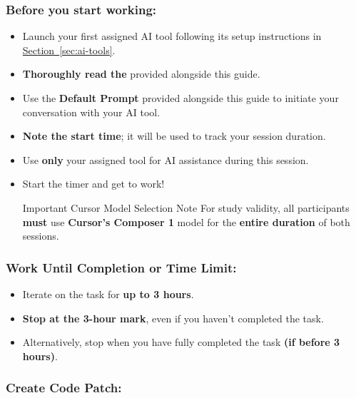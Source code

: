 \documentclass[11pt, a4paper]{article}
\newcommand{\inlinecode}[1]{%
    \raisebox{-0.2ex}{%
    \tcbox[
        enhanced,
        nobeforeafter,
        colback=codebackground,
        colframe=codebordercolor,
        coltext=codetextcolor,
        boxrule=0.5pt,
        arc=2pt,
        boxsep=0pt,
        left=0.8mm,
        right=0.8mm,
        top=0.3mm,
        bottom=0.3mm,
        fontupper=\ttfamily\small\color{codetextcolor}
    ]{#1}%
    }%
}
\begin{document}
\subsubsection*{Before you start working:}
    
    \begin{itemize}
        \item Launch your first assigned AI tool following its setup instructions in \hyperref[sec:ai-tools]{Section~\ref*{sec:ai-tools}}.
        \item \textbf{Thoroughly read the} \inlinecode{PRD.md} provided alongside this guide.
        \item Use the \textbf{Default Prompt} provided alongside this guide to initiate your conversation with your AI tool.
        \item \textbf{Note the start time}; it will be used to track your session duration.
        \item Use \textbf{only} your assigned tool for AI assistance during this session.
        \item Start the timer and get to work!
        \begin{mainbox}{Important Cursor Model Selection Note}
            For study validity, all participants \textbf{must} use \textbf{Cursor's Composer 1} model for the \textbf{entire duration} of both sessions.
        \end{mainbox}
    \end{itemize}

\subsubsection*{Work Until Completion or Time Limit:}
    
    \begin{itemize}
        \item Iterate on the task for \textbf{up to 3 hours}.
        \item \textbf{Stop at the 3-hour mark}, even if you haven't completed the task.
        \item Alternatively, stop when you have fully completed the task \textbf{(if before 3 hours)}.
    \end{itemize}

\subsubsection*{Create Code Patch:}
\label{sec:creating-patch}
\end{document}
